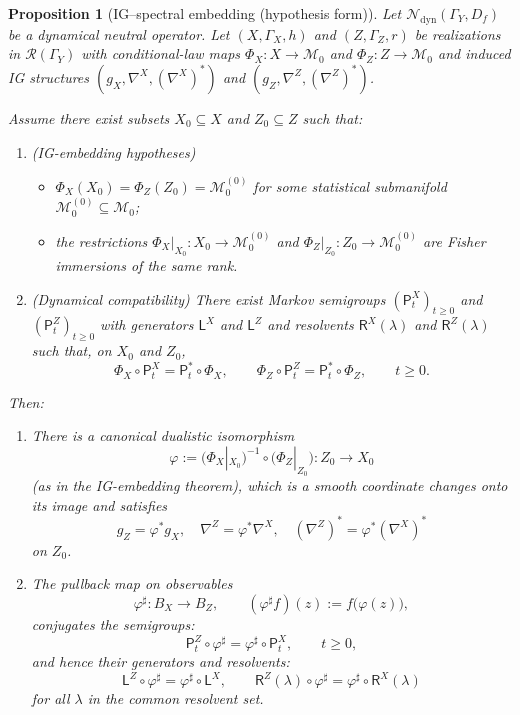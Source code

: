 \documentclass[11pt]{article}
\newtheorem{proposition}{Proposition}
\newcommand{\Rcal}{\mathcal{R}}
\newcommand{\Mcal}{\mathcal{M}}
\newcommand{\Ncal}{\mathcal{N}}
\newcommand{\Psf}{\mathsf{P}}
\newcommand{\Lsf}{\mathsf{L}}
\newcommand{\Rsf}{\mathsf{R}}
\begin{document}
\begin{proposition}[IG--spectral embedding (hypothesis form)]
\label{prop:ig-spectral-embedding-hyp}
Let $\Ncal_{\mathrm{dyn}}(\Gamma_Y,D_f)$ be a dynamical neutral operator.
Let $(X,\Gamma_X,h)$ and $(Z,\Gamma_Z,r)$ be realizations in
$\Rcal(\Gamma_Y)$ with conditional-law maps
$\Phi_X:X\to\Mcal_0$ and $\Phi_Z:Z\to\Mcal_0$ and induced IG structures
$(g_X,\nabla^X,(\nabla^X)^\ast)$ and
$(g_Z,\nabla^Z,(\nabla^Z)^\ast)$.

Assume there exist subsets $X_0\subseteq X$ and $Z_0\subseteq Z$
such that:
\begin{enumerate}[label=(I\arabic*),leftmargin=1.8em]
  \item (\emph{IG-embedding hypotheses})
  \begin{itemize}[leftmargin=1.4em]
    \item $\Phi_X(X_0) = \Phi_Z(Z_0) = \Mcal_0^{(0)}$ for some
    statistical submanifold
    $\Mcal_0^{(0)} \subseteq \Mcal_0$;
    \item the restrictions
    $\Phi_X|_{X_0}:X_0\to\Mcal_0^{(0)}$ and
    $\Phi_Z|_{Z_0}:Z_0\to\Mcal_0^{(0)}$ are Fisher immersions of
    the same rank.
  \end{itemize}
  \item (\emph{Dynamical compatibility})
  There exist Markov semigroups $(\Psf_t^X)_{t\ge 0}$ and
  $(\Psf_t^Z)_{t\ge 0}$ with generators $\Lsf^X$ and $\Lsf^Z$ and
  resolvents $\Rsf^X(\lambda)$ and $\Rsf^Z(\lambda)$ such that, on
  $X_0$ and $Z_0$,
  \[
    \Phi_X \circ \Psf_t^X
    = \Psf_t^\ast \circ \Phi_X,
    \qquad
    \Phi_Z \circ \Psf_t^Z
    = \Psf_t^\ast \circ \Phi_Z,
    \qquad t\ge 0.
  \]
\end{enumerate}

Then:
\begin{enumerate}[label=(\alph*),leftmargin=1.8em]
  \item There is a canonical dualistic isomorphism
  \[
    \varphi
    :=
    \bigl(\Phi_X|_{X_0}\bigr)^{-1}
      \circ
    \bigl(\Phi_Z|_{Z_0}\bigr)
    : Z_0 \to X_0
  \]
  (as in the IG-embedding theorem), which is a smooth coordinate changes onto
  its image and satisfies
  \[
    g_Z = \varphi^\ast g_X, \quad
    \nabla^Z = \varphi^\ast \nabla^X, \quad
    (\nabla^Z)^\ast = \varphi^\ast (\nabla^X)^\ast
  \]
  on $Z_0$.

  \item The pullback map on observables
  \[
    \varphi^\sharp : B_X \to B_Z,
    \qquad
    (\varphi^\sharp f)(z) := f\bigl(\varphi(z)\bigr),
  \]
  conjugates the semigroups:
  \[
    \Psf_t^Z \circ \varphi^\sharp
    = \varphi^\sharp \circ \Psf_t^X,
    \qquad t\ge 0,
  \]
  and hence their generators and resolvents:
  \[
    \Lsf^Z \circ \varphi^\sharp
    = \varphi^\sharp \circ \Lsf^X,
    \qquad
    \Rsf^Z(\lambda)\circ \varphi^\sharp
    = \varphi^\sharp \circ \Rsf^X(\lambda)
  \]
  for all $\lambda$ in the common resolvent set.


\end{enumerate}
\end{proposition}
\end{document}
